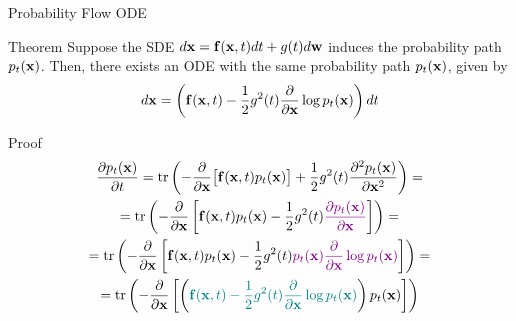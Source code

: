 \documentclass{beamer}
\renewcommand{\nextonslide}[1]{#1}
\begin{document}
\begin{frame}{Probability Flow ODE}
	\vspace{-0.3cm}
	\begin{block}{Theorem}
		Suppose the SDE $d\mathbf{x} = \mathbf{f}(\mathbf{x}, t) dt + g(t) d \mathbf{w}$ induces the probability path $p_t(\mathbf{x})$.
		Then, there exists an ODE with the same probability path $p_t(\mathbf{x})$, given by
		\vspace{-0.3cm}
		\[
			d\mathbf{x} = \left(\mathbf{f}(\mathbf{x}, t) -\frac{1}{2} g^2(t) \frac{\partial}{\partial \mathbf{x}} \log p_t(\mathbf{x}) \right) dt
		\]
		\vspace{-0.7cm}
	\end{block}
	\begin{block}{Proof}
 		\vspace{-0.7cm}
 		{\small
 		\begin{multline*}
 			\frac{\partial p_t(\bx)}{\partial t} = \tr\left( - \frac{\partial}{\partial \bx} \bigl[ \bff(\bx, t) p_t(\bx)\bigr] + \frac{1}{2} g^2(t) \frac{\partial^2 p_t(\bx)}{\partial \bx^2} \right) 
			\nextonslide{= \\ = \tr\left( - \frac{\partial}{\partial \bx} \left[ \bff(\bx, t) p_t(\bx) - \frac{1}{2} g^2(t) {\color{violet}\frac{\partial p_t(\bx)}{\partial \bx}} \right]  \right)}
			\nextonslide{ = \\ =  \tr\left( - \frac{\partial}{\partial \bx} \left[ \bff(\bx, t) p_t(\bx) - \frac{1}{2} g^2(t) {\color{violet}p_t(\bx) \frac{\partial}{\partial \bx} \log p_t(\bx)} \right]  \right)}
			\nextonslide{= \\ =  \tr\left( - \frac{\partial}{\partial \bx} \left[ \left( {\color{teal}\bff(\bx, t) - \frac{1}{2} g^2(t) \frac{\partial}{\partial \bx} \log p_t(\bx)}\right) p_t(\bx) \right]  \right)}
 		\end{multline*}
 		}
 	\end{block}
\end{frame}
\end{document}

